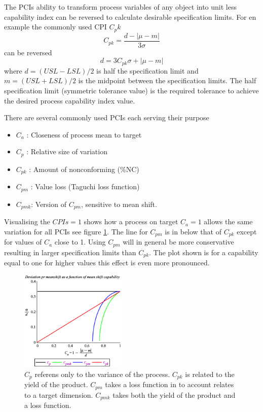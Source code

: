 \documentclass[aip,amsmath, reprint, author-year]{revtex4-1}
\begin{document}
The PCIs ability to transform process variables of any object into unit less capability index can be reversed to calculate desirable specification limits. For en example the commonly used CPI $C_pk$ 
\begin{equation}
	C_{pk} = \frac{d - | \mu - m|}{3 \sigma}
\end{equation}
can be reversed
\begin{equation}
	d = 3 C_{pk} \sigma + | \mu - m|
\end{equation}
where $d = (USL - LSL) / 2$ is half the specification limit and $m = (USL + LSL) / 2$ is the midpoint between the specification limits. The half specification limit (symmetric tolerance value) is the required tolerance to achieve the desired process capability index value. 

There are several commonly used PCIs each serving their purpose \citep{wu2009overview, taguchi1986introduction}
\begin{itemize}
	\item $C_a$ : Closeness of process mean to target 
	\item $C_p$ : Relative size of variation
	\item $C_{pk}$ : Amount of nonconforming (\%NC)
	\item $C_{pm}$ : Value loss (Taguchi loss function)
	\item $C_{pmk}$: Version of $C_{pm}$,  sensitive to mean shift. 
\end{itemize}

Visualising the $CPIs = 1$  shows how a process on target $C_a = 1$ allows the same variation for all PCIs see figure \ref{fig:CPI}. The line for $C_{pm}$ is in below that of $C_{pk}$ except for values of $C_a$ close to 1. 
Using $C_{pm}$ will in general be more conservative resulting in larger specification limits than $C_{pk}$. The plot shown is for a capability equal to one for higher values this effect is even more pronounced.

\begin{figure}
\includegraphics[width=0.45\textwidth]{graph_postscript_test.eps}
\caption{\label{fig:CPI} $C_p$ referens only to the variance of the process. $C_{pk}$ is related to the yield of the product. $C_{pm}$ takes a loss function in to account relates to a target dimension. $C_{pmk}$ takes both the yield of the product and a loss function. }
\end{figure}
\end{document}
